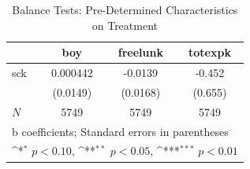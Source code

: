 \begin{table}[htbp]\centering
\def\sym#1{\ifmmode^{#1}\else\(^{#1}\)\fi}
\caption{Balance Tests: Pre-Determined Characteristics on Treatment}
\begin{tabular}{l*{3}{c}}
\hline\hline
            &\multicolumn{1}{c}{boy}&\multicolumn{1}{c}{freelunk}&\multicolumn{1}{c}{totexpk}\\
\hline
sck         &    0.000442         &     -0.0139         &      -0.452         \\
            &    (0.0149)         &    (0.0168)         &     (0.655)         \\
\hline
\(N\)       &        5749         &        5749         &        5749         \\
\hline\hline
\multicolumn{4}{l}{\footnotesize b coefficients; Standard errors in parentheses}\\
\multicolumn{4}{l}{\footnotesize \sym{*} \(p<0.10\), \sym{**} \(p<0.05\), \sym{***} \(p<0.01\)}\\
\end{tabular}
\end{table}
